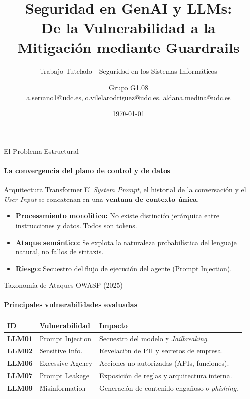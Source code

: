 \documentclass[aspectratio=169, 11pt]{beamer}
\title[Seguridad en LLMs]{Seguridad en GenAI y LLMs: \\ De la Vulnerabilidad a la Mitigación mediante Guardrails}
\subtitle{Trabajo Tutelado - Seguridad en los Sistemas Informáticos}
\author[Grupo GN]{Grupo G1.08 \\ \small a.serrano1@udc.es, o.vilelarodriguez@udc.es, aldana.medina@udc.es}
\institute[UDC]{Universidade da Coruña \\ Facultade de Informática}
\date{\today}
\begin{document}
\begin{frame}
    \titlepage
\end{frame}

\begin{frame}{El Problema Estructural}
    \framesubtitle{La convergencia del plano de control y de datos}
    
    \begin{block}{Arquitectura Transformer}
        El \textit{System Prompt}, el historial de la conversación y el \textit{User Input} se concatenan en una \textbf{ventana de contexto única}.
    \end{block}
    
    \vspace{0.5cm}
    \begin{itemize}
        \item \textbf{Procesamiento monolítico:} No existe distinción jerárquica entre instrucciones y datos. Todos son tokens.
        \item \textbf{Ataque semántico:} Se explota la naturaleza probabilística del lenguaje natural, no fallos de sintaxis.
        \item \textbf{Riesgo:} Secuestro del flujo de ejecución del agente (Prompt Injection).
    \end{itemize}
\end{frame}

\begin{frame}{Taxonomía de Ataques OWASP (2025)}
    \framesubtitle{Principales vulnerabilidades evaluadas}
    
    \begin{table}
        \centering
        \small
        \begin{tabular}{llp{7cm}}
            \toprule
            \textbf{ID} & \textbf{Vulnerabilidad} & \textbf{Impacto} \\
            \midrule
            \textbf{LLM01} & Prompt Injection & Secuestro del modelo y \textit{Jailbreaking}. \\
            \addlinespace
            \textbf{LLM02} & Sensitive Info. & Revelación de PII y secretos de empresa. \\
            \addlinespace
            \textbf{LLM06} & Excessive Agency & Acciones no autorizadas (APIs, funciones). \\
            \addlinespace
            \textbf{LLM07} & Prompt Leakage & Exposición de reglas y arquitectura interna. \\
            \addlinespace
            \textbf{LLM09} & Misinformation & Generación de contenido engañoso o \textit{phishing}. \\
            \bottomrule
        \end{tabular}
    \end{table}
\end{frame}
\end{document}
